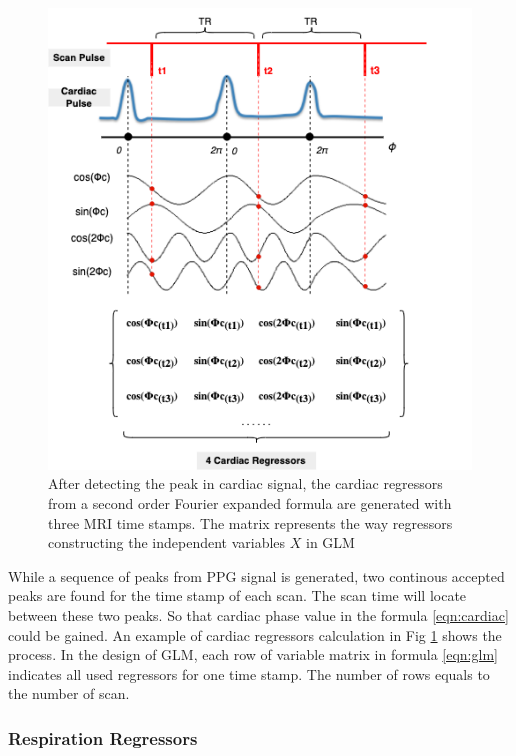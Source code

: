 \begin{figure}[htp]
    \centering
    \includegraphics[width=\columnwidth]{Figures/cardiac.png}
    \caption{After detecting the peak in cardiac signal, the cardiac regressors from a second order Fourier expanded formula are generated with three MRI time stamps. 
    The matrix represents the way regressors constructing the independent variables $X$ in GLM }
    \label{fig:cardiac}
\end{figure} 

While a sequence of peaks from PPG signal is generated, 
two continous accepted peaks are found for the time stamp of each scan.
The scan time will locate between these two peaks. 
So that cardiac phase value in the formula \ref{eqn:cardiac} could be gained. An example of 
cardiac regressors calculation in Fig \ref{fig:cardiac} shows the process. 
In the design of GLM, each row of variable matrix in formula \ref{eqn:glm} indicates all used regressors
for one time stamp. The number of rows equals to the number of scan.

\subsubsection{Respiration Regressors}


